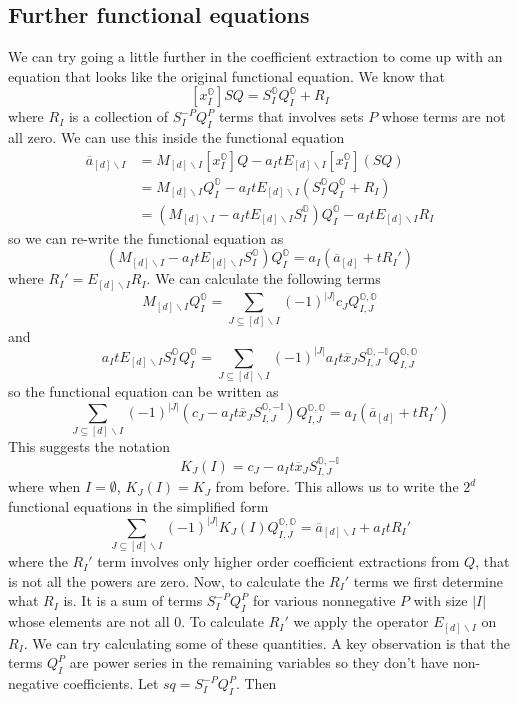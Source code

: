 \documentclass[12pt]{article}
\newcommand{\oo}{\mathbb{O}}
\newcommand{\one}{\mathbb{I}}
\theoremstyle{definition} \newtheorem{definition}[theorem]{Definition}
\newcommand{\ol}[1]{\overline{#1}}
\begin{document}
\subsection{Further functional equations}
We can try going a little further in the coefficient extraction to come up with an equation that looks like the original functional equation. We know that
\[
	[x_I^\oo] SQ  = S_I^\oo Q_I^\oo + R_I
\]
where $R_I$ is a collection of $S_I^{-P} Q_I^{P}$ terms that involves sets $P$ whose terms are not all zero. We can use this inside the functional equation
\begin{align*}
	\ol{a}_{[d]\backslash I} &= M_{[d]\backslash I}[x_I^\oo]Q- a_{I}t E_{[d]\backslash I}[x_I^\oo](SQ)\\
	& = M_{[d]\backslash I}Q_I^\oo- a_{I}t E_{[d]\backslash I}(S_I^\oo Q_I^\oo + R_I)\\
	& = (M_{[d]\backslash I} - a_{I}t E_{[d]\backslash I}S_I^\oo)Q_I^\oo  -a_{I}t E_{[d]\backslash I}R_I
\end{align*}
so we can re-write the functional equation as
\[
	(M_{[d]\backslash I} - a_{I}t E_{[d]\backslash I}S_I^\oo)Q_I^\oo = a_I(\ol{a}_{[d]}+t R_I')
\]
where $R_I' =  E_{[d]\backslash I}R_I$. We can calculate the following terms
\[
	M_{[d]\backslash I}Q_I^\oo = \sum_{J \subseteq [d]\backslash I} (-1)^{|J|}c_J Q_{I,J}^{\oo,\oo}
\]
and
\[
	a_I t E_{[d]\backslash I}S_I^\oo Q_I^\oo = \sum_{J \subseteq [d]\backslash I}  (-1)^{|J|}a_I t\ol{x}_J S_{I,J}^{\oo,-\one}Q_{I,J}^{\oo,\oo}
\]
so the functional equation can be written as
\[
	\sum_{J \subseteq [d]\backslash I}  (-1)^{|J|}(c_J - a_I t\ol{x}_J S_{I,J}^{\oo,-\one})Q_{I,J}^{\oo,\oo} = a_I(\ol{a}_{[d]}+t R_I')
\]
This suggests the notation
\[
	K_J(I) = c_J - a_I t\ol{x}_J S_{I,J}^{\oo,-\one}
\]
where when $I = \emptyset$, $K_J(I) = K_J$ from before. This allows us to write the $2^d$ functional equations in the simplified form
\[
	\sum_{J \subseteq [d]\backslash I}  (-1)^{|J|}K_J (I) Q_{I,J}^{\oo,\oo} = \ol{a}_{[d]\backslash I}+a_I t  R_I'
\]
where the $R_I'$ term involves only higher order coefficient extractions from $Q$, that is not all the powers are zero. Now, to calculate the $R_I'$ terms we first determine what $R_I$ is. It is a sum of terms $S_I^{-P} Q_I^{P}$ for various nonnegative $P$ with size $|I|$ whose elements are not all 0. To calculate $R_I'$ we apply the operator $E_{[d]\backslash I}$ on $R_I$. We can try calculating some of these quantities. A key observation is that the terms $Q_I^P$ are power series in the remaining variables so they don't have non-negative coefficients. Let $sq = S_I^{-P} Q_I^{P}$. Then
\end{document}
